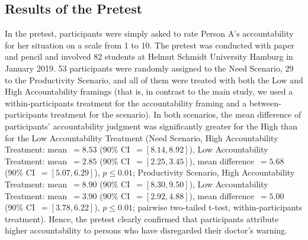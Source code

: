 \documentclass[smallcondensed]{svjour3}
\begin{document}
\subsection*{Results of the Pretest}
%
In the pretest, participants were simply asked to rate Person A's accountability for her situation on a scale from 1 to 10. The pretest was conducted with paper and pencil and involved 82 students at Helmut Schmidt University Hamburg in January 2019. 53 participants were randomly assigned to the Need Scenario, 29 to the Productivity Scenario, and all of them were treated with both the Low and High Accountability framings (that is, in contrast to the main study, we used a within-participants treatment for the accountability framing and a between-participants treatment for the scenario). In both scenarios, the mean difference of participants' accountability judgment was significantly greater for the High than for the Low Accountability Treatment (Need Scenario, High Accountability Treatment: mean~$=8.53$ (90\% CI~$=[8.14,8.92]$), Low Accountability Treatment: mean~$=2.85$ (90\% CI~$=[2.25,3.45]$), mean difference~$=5.68$ (90\% CI~$=[5.07,6.29]$), $p\le0.01$; Productivity Scenario, High Accountability Treatment: mean~$=8.90$ (90\% CI~$=[8.30,9.50]$), Low Accountability Treatment: mean~$=3.90$ (90\% CI~$=[2.92,4.88]$), mean difference~$=5.00$ (90\% CI~$=[3.78,6.22]$), $p\le0.01$; pairwise two-tailed t-test, within-participants treatment). Hence, the pretest clearly confirmed that participants attribute higher accountability to persons who have disregarded their doctor's warning.\par
%
\end{document}
